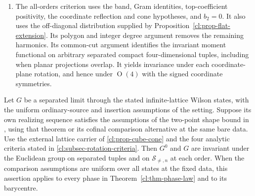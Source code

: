 \documentclass[11pt,letterpaper,reqno]{amsart}
\makeatletter
\numberwithin{equation}{section}
\theoremstyle{definition}
\newcommand{\ms@majorstart}{%
  \pushQED{\qed}\renewcommand{\qedsymbol}{$\blacksquare\square$}}
\newenvironment{theorem}[1][]{\ms@majorstart\ms@theorem[#1]}
  {\popQED\endms@theorem}
\theoremstyle{remark}
\makeatother
\begin{document}
\begin{enumerate}
\item The all-orders criterion uses the band, Gram
identities, top-coefficient positivity, the coordinate
reflection and cone hypotheses, and \(b_2=0\). It also uses
the off-diagonal distribution supplied by
Proposition~\ref{cl:prop-flat-extension}.
Its polygon and integer degree argument removes the
remaining harmonics. Its common-cut argument identifies
the invariant moment functional on arbitrary separated
compact four-dimensional tuples, including when planar
projections overlap. It yields invariance under each
coordinate-plane rotation, and hence under
\(\operatorname{O}(4)\) with the signed coordinate
symmetries.
\end{enumerate}

\begin{theorem}[Rotations of the realized limits]
\label{cl:thm-euclidean-rotations}
Let \(G\) be a separated limit through the stated
infinite-lattice Wilson states, with the uniform
ordinary-source and insertion assumptions of the
setting. Suppose its own realizing sequence satisfies
the assumptions of the two-point shape bound in
\cite[Theorem~A and the ultraviolet shape corollary]{FP},
using that theorem or its cofinal comparison
alternative at the same bare data. Use the external lattice
carrier of \cref{cl:prop-cube-cone} and the four analytic
criteria stated in \cref{cl:subsec-rotation-criteria}.
Then \(G^0\)
and \(G\) are invariant under the Euclidean group on
separated tuples and on \(\mathcal S_{\ne,n}\) at
each order. When the comparison assumptions are
uniform over all states at the fixed data, this
assertion applies to every phase in
Theorem~\ref{cl:thm-phase-law} and to its barycentre.
\end{theorem}
\end{document}
